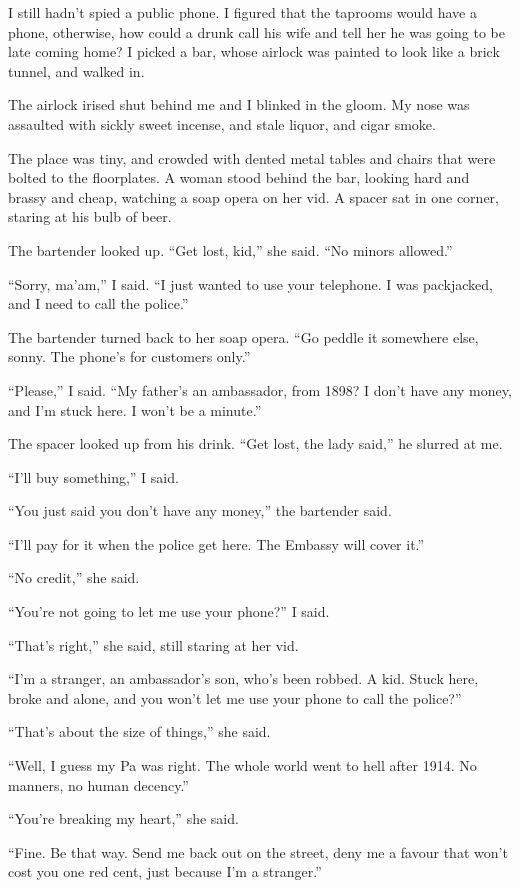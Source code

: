 I still hadn't spied a public phone. I figured that the taprooms
would have a phone, otherwise, how could a drunk call his wife and
tell her he was going to be late coming home? I picked a bar, whose
airlock was painted to look like a brick tunnel, and walked in.

The airlock irised shut behind me and I blinked in the gloom. My
nose was assaulted with sickly sweet incense, and stale liquor, and
cigar smoke.

The place was tiny, and crowded with dented metal tables and chairs
that were bolted to the floorplates. A woman stood behind the bar,
looking hard and brassy and cheap, watching a soap opera on her
vid. A spacer sat in one corner, staring at his bulb of beer.

The bartender looked up. ``Get lost, kid,'' she said.
``No minors allowed.''

``Sorry, ma'am,'' I said.
``I just wanted to use your telephone. I was packjacked, and I need to call the 
police.''

The bartender turned back to her soap opera.
``Go peddle it somewhere else, sonny. The phone's for customers only.''

``Please,'' I said.
``My father's an ambassador, from 1898? I don't have any money, and I'm stuck 
here. I won't be a minute.''

The spacer looked up from his drink. ``Get lost, the lady said,''
he slurred at me.

``I'll buy something,'' I said.

``You just said you don't have any money,'' the bartender said.

``I'll pay for it when the police get here. The Embassy will cover it.''

``No credit,'' she said.

``You're not going to let me use your phone?'' I said.

``That's right,'' she said, still staring at her vid.

``I'm a stranger, an ambassador's son, who's been robbed. A kid. Stuck here, 
broke and alone, and you won't let me use your phone to call the police?''

``That's about the size of things,'' she said.

``Well, I guess my Pa was right. The whole world went to hell after 1914. No 
manners, no human decency.''

``You're breaking my heart,'' she said.

``Fine. Be that way. Send me back out on the street, deny me a favour that 
won't cost you one red cent, just because I'm a stranger.''

